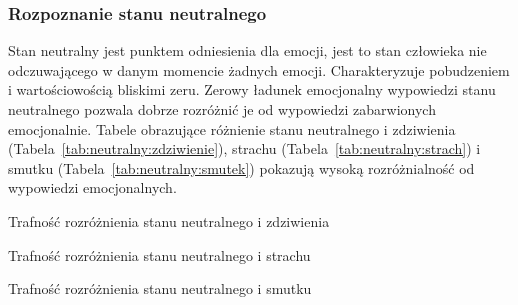 \documentclass[a4paper,12pt,twoside,openany]{report}
\newcommand{\Tab}[1]{(Tabela~\ref{#1})}
\begin{document}
\subsubsection{Rozpoznanie stanu neutralnego}
Stan neutralny jest punktem odniesienia dla emocji, jest to stan człowieka nie odczuwającego w danym momencie żadnych emocji.
Charakteryzuje pobudzeniem i wartościowością bliskimi zeru.
Zerowy ładunek emocjonalny wypowiedzi stanu neutralnego pozwala dobrze rozróżnić je od wypowiedzi zabarwionych emocjonalnie. 
Tabele obrazujące różnienie stanu neutralnego i zdziwienia \Tab{tab:neutralny:zdziwienie}, strachu \Tab{tab:neutralny:strach} i smutku \Tab{tab:neutralny:smutek}
pokazują wysoką rozróżnialność od wypowiedzi emocjonalnych. 
\begin{table}[hc!]
	\caption{Trafność rozróżnienia stanu neutralnego i zdziwienia}
	\centering
	
	\label{tab:neutralny:zdziwienie}
\end{table}
\begin{table}[hc!]
	\caption{Trafność rozróżnienia stanu neutralnego i strachu}
	\centering
	
	\label{tab:neutralny:strach}
\end{table}
\begin{table}[hc!]
	\caption{Trafność rozróżnienia stanu neutralnego i smutku}
	\centering
	
	\label{tab:neutralny:smutek}
\end{table}
\end{document}
